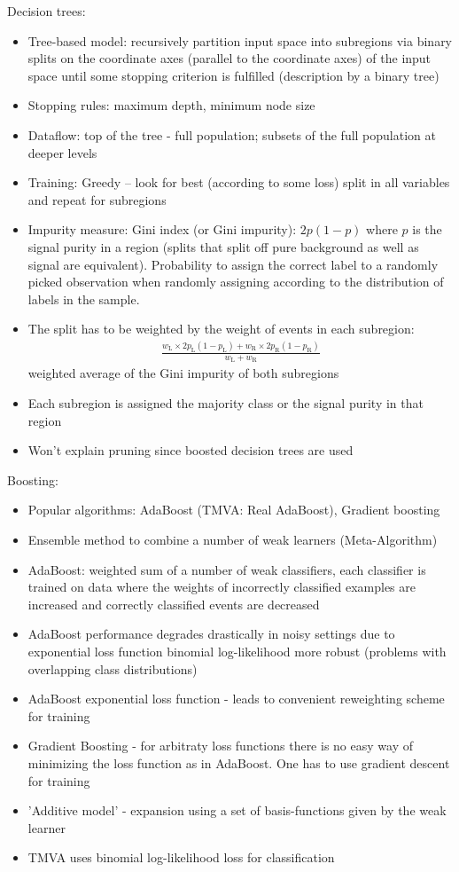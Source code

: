 Decision trees:
\begin{itemize}
\item Tree-based model: recursively partition input space into subregions via
  binary splits on the coordinate axes (parallel to the coordinate axes) of the
  input space until some stopping criterion is fulfilled (description by a
  binary tree)
\item Stopping rules: maximum depth, minimum node size
\item Dataflow: top of the tree - full population; subsets of the full
  population at deeper levels
\item Training: Greedy -- look for best (according to some loss) split in all
  variables and repeat for subregions
\item Impurity measure: Gini index (or Gini impurity): $2 p (1 - p)$ where $p$
  is the signal purity in a region (splits that split off pure background as
  well as signal are equivalent). Probability to assign the correct label to a
  randomly picked observation when randomly assigning according to the
  distribution of labels in the sample.
\item The split has to be weighted by the weight of events in each subregion:
  \begin{align*}
    \frac{w_\mathrm{L} \times 2 p_\mathrm{L} (1 - p_\mathrm{L}) + w_\mathrm{R} \times 2 p_\mathrm{R} (1 - p_\mathrm{R})}{w_\mathrm{L} + w_\mathrm{R}}
  \end{align*}
  weighted average of the Gini impurity of both subregions
\item Each subregion is assigned the majority class or the signal purity in that region
\item Won't explain pruning since boosted decision trees are used
\end{itemize}

Boosting:
\begin{itemize}
\item Popular algorithms: AdaBoost (TMVA: Real AdaBoost), Gradient boosting
\item Ensemble method to combine a number of weak learners (Meta-Algorithm)
\item AdaBoost: weighted sum of a number of weak classifiers, each classifier is
  trained on data where the weights of incorrectly classified examples are
  increased and correctly classified events are decreased
\item AdaBoost performance degrades drastically in noisy settings due to
  exponential loss function \cite{esl} binomial log-likelihood more robust
  (problems with overlapping class distributions)
\item AdaBoost exponential loss function - leads to convenient reweighting
  scheme for training
\item Gradient Boosting - for arbitraty loss functions there is no easy way of
  minimizing the loss function as in AdaBoost. One has to use gradient descent
  for training
\item 'Additive model' - expansion using a set of basis-functions given by the
  weak learner
\item TMVA uses binomial log-likelihood loss for classification\cite{tmva}
\end{itemize}

